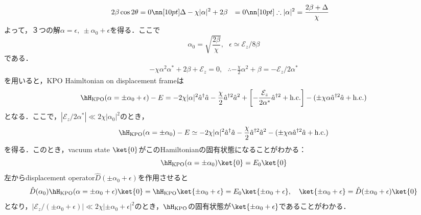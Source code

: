 \begin{align}
    2\beta\cos{2\theta}&=0\nn[10pt]
    \Delta- \chi|\alpha|^2
    +2\beta&=0\nn[10pt]
    \therefore
    |\alpha|^2
    &=\frac{2\beta+\Delta}{\chi}
\end{align}
よって，３つの解$\alpha=\epsilon,\ \pm\alpha_0+\epsilon$を得る．ここで
\begin{equation}
    \alpha_0 = \sqrt{\frac{2\beta}{\chi}},\ \ \ 
    \epsilon \simeq \mathcal{E}_z/8\beta
\end{equation}
である．
\begin{align}
    - \chi\alpha^2\alpha^\ast
    +2\beta+\mathcal{E}_z=0,\ \ \ 
    \therefore - \frac{\chi}{2}\alpha^2+\beta=-\mathcal{E}_z/2\alpha^\ast
\end{align}
を用いると，KPO Haimltonian on displacement frameは
\begin{align}
    \hH_{\rm{KPO}}(\alpha=\pm\alpha_0 + \epsilon)-E
    =
    - 2\chi|\alpha|^2\hat{a}^{\dagger}\hat{a}
    - \frac{\chi}{2}\hat{a}^{\dagger2}\hat{a}^2
    +\left[-\frac{\mathcal{E}_z}{2\alpha^\ast}\hat{a}^{\dagger2}
    +{\rm{h.c.}}\right]
    - (\pm\chi\alpha\hat{a}^{\dagger2}\hat{a} +{\rm{h.c.}} )
\end{align}
となる．ここで，$|{\mathcal{E}_z}/{2\alpha^\ast}|\ll 2\chi|\alpha_0|^2$のとき，
\begin{equation}
    \hH_{\rm{KPO}}(\alpha=\pm\alpha_0) - E
    \simeq
    - 2\chi|\alpha|^2\hat{a}^{\dagger}\hat{a}
    - \frac{\chi}{2}\hat{a}^{\dagger2}\hat{a}^2
    - (\pm\chi\alpha\hat{a}^{\dagger2}\hat{a} +{\rm{h.c.}} )
\end{equation}
を得る．このとき，vacuum state $\ket{0}$がこのHamiltonianの固有状態になることがわかる：
\begin{equation}
    \hH_{\rm{KPO}}(\alpha=\pm\alpha_0)\ket{0}
    =E_0\ket{0}
\end{equation}
左からdisplacement operator$\hat{D}(\pm\alpha_0 + \epsilon)$を作用させると
\begin{equation}
    \hat{D}(\alpha_0)\hH_{\rm{KPO}}(\alpha=\pm\alpha_0 + \epsilon)\ket{0}
    =\hH_{\rm{KPO}}\ket{\pm\alpha_0 + \epsilon}
    =E_0\ket{\pm\alpha_0 + \epsilon},\ \ \ 
    \ket{\pm\alpha_0 + \epsilon}=\hat{D}(\pm\alpha_0 + \epsilon)\ket{0}
\end{equation}
となり，$|{\mathcal{E}_z}/{(\pm\alpha_0 + \epsilon)}|\ll 2\chi|\pm\alpha_0 + \epsilon|^2$のとき，$\hH_{\rm{KPO}}$の固有状態が$\ket{\pm\alpha_0 + \epsilon}$であることがわかる．




